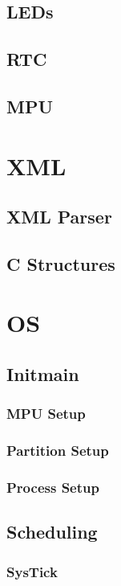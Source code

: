 \subsection{LEDs}

\subsection{RTC}

\subsection{MPU}


\section{XML}

\subsection{XML Parser}

\subsection{C Structures}


\section{OS}

\subsection{Init\/main}

\subsubsection{MPU Setup}
\subsubsection{Partition Setup}
\subsubsection{Process Setup}

\subsection{Scheduling}

\subsubsection{SysTick}

